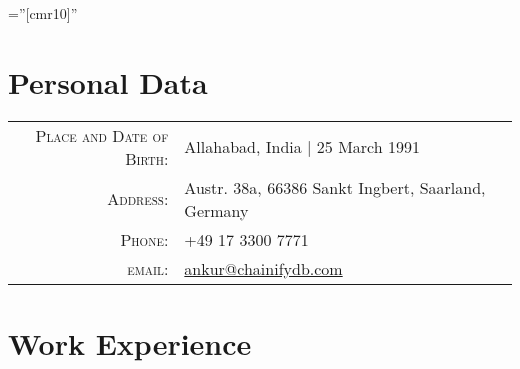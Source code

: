 \documentclass[a4paper,10pt]{article} %
\begin{document}
\pagestyle{empty} %

\font\fb=''[cmr10]'' %

\vspace{-0.5cm}
\par{\bigskip\par} %

\section{Personal Data}

\begin{tabular}{rl}
\textsc{Place and Date of Birth:} & Allahabad, India  | 25 March 1991 \\
\textsc{Address:} & Austr. 38a, 66386 Sankt Ingbert, Saarland, Germany \\
\textsc{Phone:} & +49 17 3300 7771\\
\textsc{email:} & \href{mailto:ankur@chainifydb.com}{ankur@chainifydb.com}
\end{tabular}


\section{Work Experience}
\end{document}
